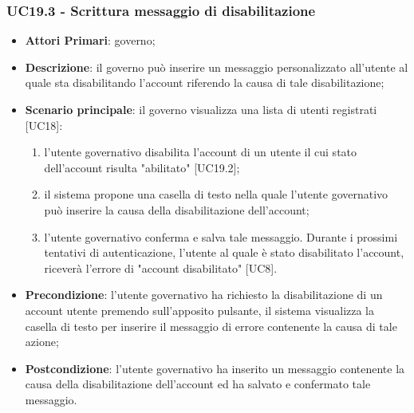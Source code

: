 \subsubsection{UC19.3 - Scrittura messaggio di disabilitazione}
\begin{itemize}
	\item \textbf{Attori Primari}:
	governo;
	\item \textbf{Descrizione}: il governo può inserire un messaggio personalizzato all'utente al quale sta disabilitando l'account riferendo la causa di tale disabilitazione;
	\item \textbf{Scenario principale}: il governo visualizza una lista di utenti registrati [UC18]:
	\begin{enumerate}[label=\alph*.]
		\item l'utente governativo disabilita l'account di un utente il cui stato dell'account risulta "abilitato" [UC19.2];
		\item il sistema propone una casella di testo nella quale l'utente governativo può inserire la causa della disabilitazione dell'account;
		\item l'utente governativo conferma e salva tale messaggio. Durante i prossimi tentativi di autenticazione, l'utente al quale è stato disabilitato l'account, riceverà l'errore di "account disabilitato" [UC8].
	\end{enumerate}
	 
	\item \textbf{Precondizione}: l'utente governativo ha richiesto la disabilitazione di un account utente premendo sull'apposito pulsante, il sistema visualizza la casella di testo per inserire il messaggio di errore contenente la causa di tale azione;
	\item \textbf{Postcondizione}: l'utente governativo ha inserito un messaggio contenente la causa della disabilitazione dell'account ed ha salvato e confermato tale messaggio.
\end{itemize}



